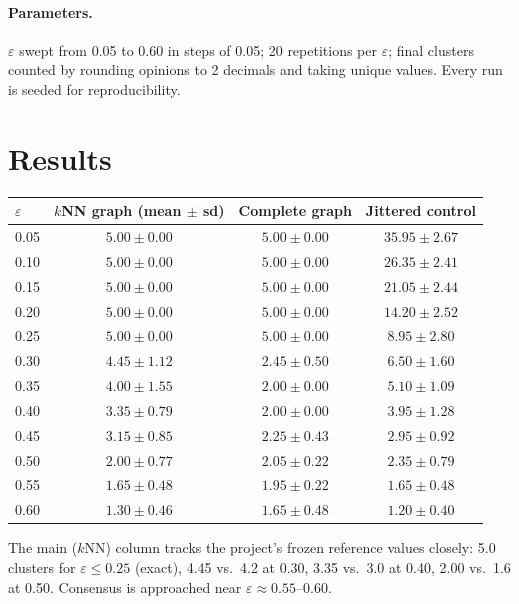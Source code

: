 \documentclass[11pt]{article}
\begin{document}
\paragraph{Parameters.} $\varepsilon$ swept from 0.05 to 0.60 in steps of
0.05; 20 repetitions per $\varepsilon$; final clusters counted by rounding
opinions to 2 decimals and taking unique values. Every run is seeded for
reproducibility.

\section{Results}

\begin{center}
\begin{tabular}{lccc}
\toprule
$\varepsilon$ & $k$NN graph (mean $\pm$ sd) & Complete graph & Jittered control \\
\midrule
0.05 & $5.00 \pm 0.00$ & $5.00 \pm 0.00$ & $35.95 \pm 2.67$ \\
0.10 & $5.00 \pm 0.00$ & $5.00 \pm 0.00$ & $26.35 \pm 2.41$ \\
0.15 & $5.00 \pm 0.00$ & $5.00 \pm 0.00$ & $21.05 \pm 2.44$ \\
0.20 & $5.00 \pm 0.00$ & $5.00 \pm 0.00$ & $14.20 \pm 2.52$ \\
0.25 & $5.00 \pm 0.00$ & $5.00 \pm 0.00$ & $8.95 \pm 2.80$ \\
\midrule
0.30 & $4.45 \pm 1.12$ & $2.45 \pm 0.50$ & $6.50 \pm 1.60$ \\
0.35 & $4.00 \pm 1.55$ & $2.00 \pm 0.00$ & $5.10 \pm 1.09$ \\
0.40 & $3.35 \pm 0.79$ & $2.00 \pm 0.00$ & $3.95 \pm 1.28$ \\
0.45 & $3.15 \pm 0.85$ & $2.25 \pm 0.43$ & $2.95 \pm 0.92$ \\
0.50 & $2.00 \pm 0.77$ & $2.05 \pm 0.22$ & $2.35 \pm 0.79$ \\
0.55 & $1.65 \pm 0.48$ & $1.95 \pm 0.22$ & $1.65 \pm 0.48$ \\
0.60 & $1.30 \pm 0.46$ & $1.65 \pm 0.48$ & $1.20 \pm 0.40$ \\
\bottomrule
\end{tabular}
\end{center}

The main ($k$NN) column tracks the project's frozen reference values closely:
5.0 clusters for $\varepsilon \le 0.25$ (exact), 4.45 vs.\ 4.2 at 0.30, 3.35
vs.\ 3.0 at 0.40, 2.00 vs.\ 1.6 at 0.50. Consensus is approached near
$\varepsilon \approx 0.55$--$0.60$.
\end{document}
